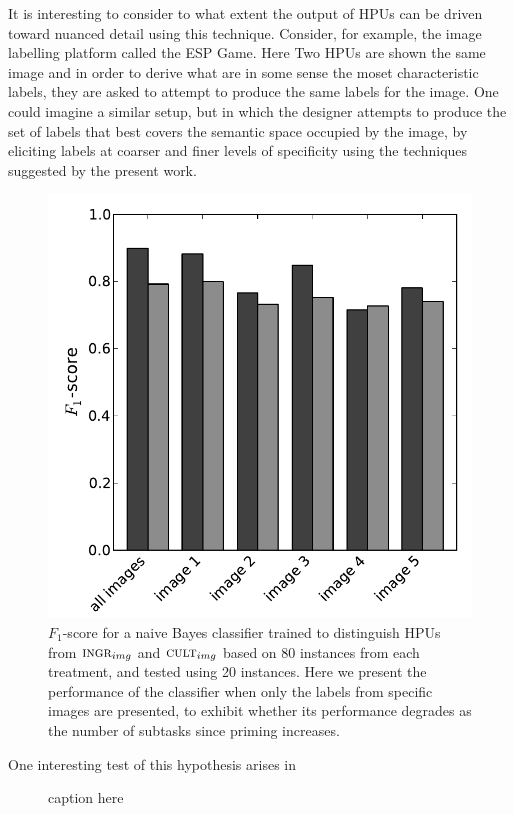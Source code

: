 \documentclass[letterpaper, 11pt, twocolumn]{article}
\begin{document}
It is interesting to consider to what extent the output of HPUs can be driven
toward nuanced detail using this technique.  Consider, for example, the 
image labelling platform called the ESP Game.  Here Two HPUs are shown
the same image and in order to derive what are in some sense the moset 
characteristic labels, they are asked to attempt to produce the same labels
for the image.  One could imagine a similar setup, but in which the designer
attempts to produce the set of labels that best covers the semantic space 
occupied by the image, by eliciting labels at coarser and finer levels of 
specificity using the techniques suggested by the present work.

\begin{figure}
	\includegraphics[scale=0.58]{../figs/longitudinalF1scores.pdf}
\caption{$F_1$-score for a naive Bayes classifier trained to distinguish
	HPUs from $\textsc{ingr}_{img}$ and $\textsc{cult}_{img}$ based on 80  
	instances from each treatment, and tested using 20 instances.  Here we
	present the performance of the classifier when only the labels from 
	specific images are presented, to exhibit whether its performance degrades 
	as the number of subtasks since priming increases. 
	}
	\label{fig:longitude}
\end{figure}


One interesting test of this hypothesis arises in 
\begin{figure}
	\caption{caption here}
	\label{fig:testImages}
\end{figure}
\end{document}
